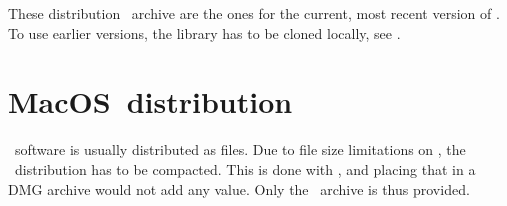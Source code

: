 These distribution \zip\ archive are the ones for the current, most recent version of \mf. To use earlier versions, the library has to be cloned locally, see \Ref{}.


\section{MacOS\texttrademark\ distribution}

\MacOS\ software is usually distributed as  files. Due to file size limitations on \github, the \MacOS\ distribution has to be compacted. This is done with \zip, and placing that in a DMG archive would not add any value. Only the \zip\ archive is thus provided.



